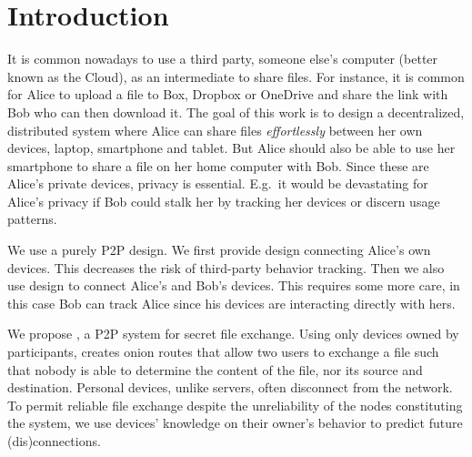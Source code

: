 \section{Introduction}


It is common nowadays to use a third party, \ie someone else's computer (better 
known as the Cloud), as an intermediate to share files.
For instance, it is common for Alice to upload a file to \eg Box, Dropbox or 
OneDrive and share the link with Bob who can then download it.
The goal of this work is to design a decentralized, distributed system where 
Alice can share files \emph{effortlessly} between her own devices, \eg laptop, 
smartphone and tablet.
But Alice should also be able to use her smartphone to share a file on her home 
computer with Bob.
Since these are Alice's private devices, privacy is essential.
E.g.\ it would be devastating for Alice's privacy if Bob could stalk her by 
tracking her devices or discern usage patterns.




We use a purely \ac{P2P} design.
We first provide  design connecting Alice's own devices.
This decreases the risk of third-party behavior tracking.
Then we also use  design to connect Alice's and Bob's devices.
This requires some more care, in this case Bob can track Alice since his devices 
are interacting directly with hers.



We propose \name, a \ac{P2P} system for secret file exchange.
Using only devices owned by participants, \name creates onion routes that allow two users to exchange a file such that nobody is able to determine the content of the file, nor its source and destination.
Personal devices, unlike servers, often disconnect from the network. To permit reliable file exchange despite the unreliability of the nodes constituting the system, we use devices' knowledge on their owner's behavior to predict future (dis)connections. 
